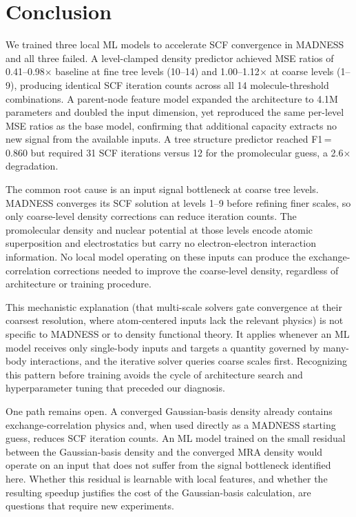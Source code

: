 \section{Conclusion}
\label{sec:conclusion}

We trained three local ML models to accelerate SCF convergence in
MADNESS and all three failed. A level-clamped density predictor achieved
MSE ratios of 0.41--0.98$\times$ baseline at fine tree levels (10--14)
and 1.00--1.12$\times$ at coarse levels (1--9), producing identical SCF
iteration counts across all 14 molecule-threshold combinations.
A parent-node feature model expanded the architecture to 4.1M parameters
and doubled the input dimension, yet reproduced the same per-level MSE
ratios as the base model, confirming that additional capacity extracts no
new signal from the available inputs. A tree structure predictor reached
F1\,=\,0.860 but required 31 SCF iterations versus 12 for the
promolecular guess, a 2.6$\times$ degradation.

The common root cause is an input signal bottleneck at coarse tree
levels. MADNESS converges its SCF solution at levels 1--9 before
refining finer scales, so only coarse-level density corrections can
reduce iteration counts. The promolecular density and nuclear potential
at those levels encode atomic superposition and electrostatics but carry
no electron-electron interaction information. No local model operating on
these inputs can produce the exchange-correlation corrections needed to
improve the coarse-level density, regardless of architecture or training
procedure.

This mechanistic explanation (that multi-scale solvers gate convergence
at their coarsest resolution, where atom-centered inputs lack the
relevant physics) is not specific to MADNESS or to density functional
theory. It applies whenever an ML model receives only single-body inputs
and targets a quantity governed by many-body interactions, and the
iterative solver queries coarse scales first. Recognizing this pattern
before training avoids the cycle of architecture search and
hyperparameter tuning that preceded our diagnosis.

One path remains open. A converged Gaussian-basis density already
contains exchange-correlation physics and, when used directly as a
MADNESS starting guess, reduces SCF iteration counts. An ML model
trained on the small residual between the Gaussian-basis density and the
converged MRA density would operate on an input that does not suffer from
the signal bottleneck identified here. Whether this residual is
learnable with local features, and whether the resulting speedup
justifies the cost of the Gaussian-basis calculation, are questions that
require new experiments.
